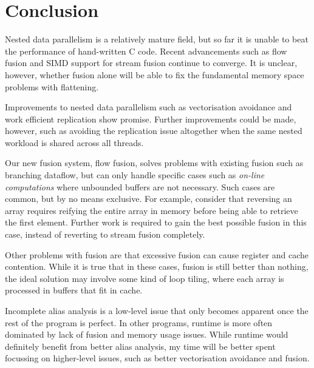 \section{Conclusion}

Nested data parallelism is a relatively mature field, but so far it is unable to beat the performance of hand-written C code.
Recent advancements such as flow fusion\cite{lippmeier2013flow} and SIMD support for stream fusion\cite{mainland2013haskell}
continue to converge.
It is unclear, however, whether fusion alone will be able to fix the fundamental memory space problems with flattening\cite{lippmeier2012work}.

Improvements to nested data parallelism such as vectorisation avoidance\cite{keller2012vectorisation}
and work efficient replication\cite{lippmeier2012work} show promise.
Further improvements could be made, however, such as avoiding the replication issue altogether when the same nested workload is shared across all threads.

Our new fusion system, flow fusion\cite{lippmeier2013flow}, solves problems with existing fusion such as branching dataflow,
but can only handle specific cases such as \emph{on-line computations} where unbounded buffers are not necessary.
Such cases are common, but by no means exclusive.
For example, consider that reversing an array requires reifying the entire array in memory before being able to retrieve the first element.
Further work is required to gain the best possible fusion in this case, instead of reverting to stream fusion completely.

Other problems with fusion are that excessive fusion can cause register and cache contention\cite{song2004improving}.
While it is true that in these cases, fusion is still better than nothing,
the ideal solution may involve some kind of loop tiling\cite{pike2002better},
where each array is processed in buffers that fit in cache.

Incomplete alias analysis is a low-level issue that only becomes apparent once the rest of the program is perfect.
In other programs, runtime is more often dominated by lack of fusion and memory usage issues.
While runtime would definitely benefit from better alias analysis, my time will be better spent focussing on higher-level issues,
such as better vectorisation avoidance and fusion.


